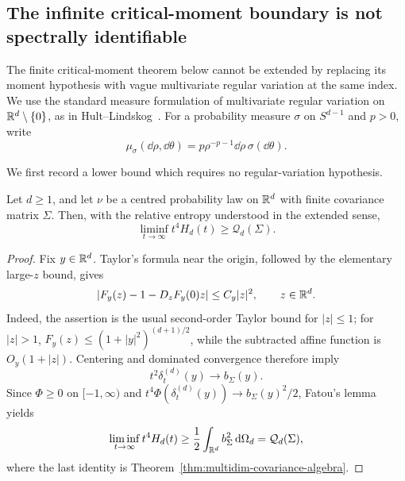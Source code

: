 \subsection{The infinite critical-moment boundary is not spectrally identifiable}

The finite critical-moment theorem below cannot be extended by replacing its
moment hypothesis with vague multivariate regular variation at the same
index.  We use the standard measure formulation of multivariate regular
variation on \(\mathbb{R}^d\setminus\{0\}\), as in
Hult--Lindskog~\cite{HultLindskog2006RegularVariation}.  For a probability
measure \(\sigma\) on \(S^{d-1}\) and \(p>0\), write
\begin{equation}\label{eq:critical-rv-tail-measure}
 \mu_\sigma(\dd\rho,\dd\theta)
 =p\rho^{-p-1}\dd\rho\,\sigma(\dd\theta).
\end{equation}

We first record a lower bound which requires no regular-variation
hypothesis.

\begin{lemma}
\label{lem:finite-covariance-fatou-lower-bound}
Let \(d\ge1\), and let \(\nu\) be a centred probability law on \(\mathbb{R}^d\)
with finite covariance matrix \(\Sigma\).  Then, with the relative entropy
understood in the extended sense,
\begin{equation}\label{eq:finite-covariance-fatou-lower-bound}
 \liminf_{t\to\infty}t^4H_d(t)\ge \mathcal Q_d(\Sigma).
\end{equation}
\end{lemma}

\begin{proof}
Fix \(y\in\mathbb{R}^d\).  Taylor's formula near the origin, followed by the
elementary large-\(z\) bound, gives
\[
 \left|F_y(z)-1-D_zF_y(0)z\right|\le C_y|z|^2,
 \qquad z\in\mathbb{R}^d.
\]
Indeed, the assertion is the usual second-order Taylor bound for
\(|z|\le1\); for \(|z|>1\), \(F_y(z)\le(1+|y|^2)^{(d+1)/2}\), while the
subtracted affine function is \(O_y(1+|z|)\).  Centering and dominated
convergence therefore imply
\[
 t^2\delta_t^{(d)}(y)\longrightarrow b_\Sigma(y).
\]
Since \(\Phi\ge0\) on \([-1,\infty)\) and
\(t^4\Phi(\delta_t^{(d)}(y))\to b_\Sigma(y)^2/2\), Fatou's lemma yields
\[
 \liminf_{t\to\infty}t^4H_d(t)
 \ge \frac12\int_{\mathbb{R}^d}b_\Sigma^2\,\mathrm{d}\Omega_d
 =\mathcal Q_d(\Sigma),
\]
where the last identity is Theorem~\ref{thm:multidim-covariance-algebra}.
\end{proof}

